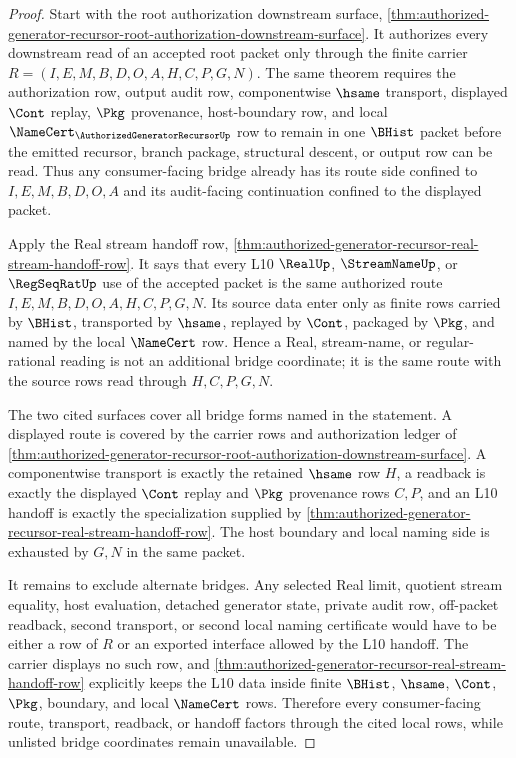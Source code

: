 \begin{proof}
Start with the root authorization downstream surface, \autoref{thm:authorized-generator-recursor-root-authorization-downstream-surface}. It authorizes every downstream read of an accepted root packet only through the finite carrier $R=(I,E,M,B,D,O,A,H,C,P,G,N)$. The same theorem requires the authorization row, output audit row, componentwise $\hsame$ transport, displayed $\Cont$ replay, $\Pkg$ provenance, host-boundary row, and local $\NameCert_{\AuthorizedGeneratorRecursorUp}$ row to remain in one $\BHist$ packet before the emitted recursor, branch package, structural descent, or output row can be read. Thus any consumer-facing bridge already has its route side confined to $I,E,M,B,D,O,A$ and its audit-facing continuation confined to the displayed packet.

Apply the Real stream handoff row, \autoref{thm:authorized-generator-recursor-real-stream-handoff-row}. It says that every L10 $\RealUp$, $\StreamNameUp$, or $\RegSeqRatUp$ use of the accepted packet is the same authorized route $I,E,M,B,D,O,A,H,C,P,G,N$. Its source data enter only as finite rows carried by $\BHist$, transported by $\hsame$, replayed by $\Cont$, packaged by $\Pkg$, and named by the local $\NameCert$ row. Hence a Real, stream-name, or regular-rational reading is not an additional bridge coordinate; it is the same route with the source rows read through $H,C,P,G,N$.

The two cited surfaces cover all bridge forms named in the statement. A displayed route is covered by the carrier rows and authorization ledger of \autoref{thm:authorized-generator-recursor-root-authorization-downstream-surface}. A componentwise transport is exactly the retained $\hsame$ row $H$, a readback is exactly the displayed $\Cont$ replay and $\Pkg$ provenance rows $C,P$, and an L10 handoff is exactly the specialization supplied by \autoref{thm:authorized-generator-recursor-real-stream-handoff-row}. The host boundary and local naming side is exhausted by $G,N$ in the same packet.

It remains to exclude alternate bridges. Any selected Real limit, quotient stream equality, host evaluation, detached generator state, private audit row, off-packet readback, second transport, or second local naming certificate would have to be either a row of $R$ or an exported interface allowed by the L10 handoff. The carrier displays no such row, and \autoref{thm:authorized-generator-recursor-real-stream-handoff-row} explicitly keeps the L10 data inside finite $\BHist$, $\hsame$, $\Cont$, $\Pkg$, boundary, and local $\NameCert$ rows. Therefore every consumer-facing route, transport, readback, or handoff factors through the cited local rows, while unlisted bridge coordinates remain unavailable.
\end{proof}

